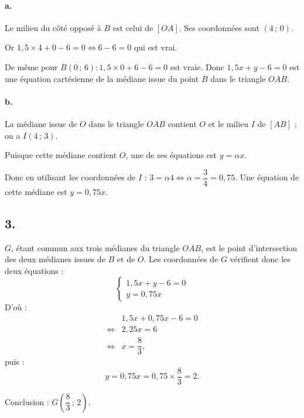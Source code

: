 \documentclass[10pt]{article}
\begin{document}
\paragraph{a.} Le milieu du côté opposé à \( B \) est celui de \([OA]\). Ses coordonnées sont \( (4 \,;\, 0) \).

Or \( 1{,}5 \times 4 + 0 - 6 = 0 \iff 6 - 6 = 0 \) qui est vrai.

De même pour \( B(0 \,;\, 6) : 1{,}5 \times 0 + 6 - 6 = 0 \) est vraie. Donc \( 1{,}5x + y - 6 = 0 \) est une équation cartésienne de la médiane issue du point \( B \) dans le triangle \( OAB \).

\paragraph{b.} La médiane issue de \( O \) dans le triangle \( OAB \) contient \( O \) et le milieu \( I \) de \([AB]\) ; on a \( I(4 \,;\, 3) \).

Puisque cette médiane contient \( O \), une de ses équations est \( y = \alpha x \).

Donc en utilisant les coordonnées de \( I \) : \( 3 = \alpha 4 \iff \alpha = \dfrac{3}{4} = 0{,}75 \). Une équation de cette médiane est \( y = 0{,}75x \).

\subsection*{3.}

\( G \), étant commun aux trois médianes du triangle \( OAB \), est le point d'intersection des deux médianes issues de \( B \) et de \( O \). Les coordonnées de \( G \) vérifient donc les deux équations :
\[
\begin{cases}
1{,}5x + y - 6 = 0 \\
y = 0{,}75x
\end{cases}
\]
D'où :
\begin{align*}
&1{,}5x + 0{,}75x - 6 = 0 \\
\iff &2{,}25x = 6 \\
\iff &x = \dfrac{8}{3},
\end{align*}
puis :
\[
y = 0{,}75x = 0{,}75 \times \dfrac{8}{3} = 2.
\]

Conclusion : \( G\left(\dfrac{8}{3} \,;\, 2\right) \).
\end{document}
